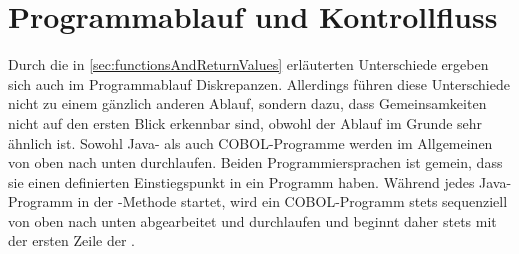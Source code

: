 \section{Programmablauf und Kontrollfluss}\label{programmablauf}
Durch die in \autoref{sec:functionsAndReturnValues} erläuterten Unterschiede ergeben sich auch im Pro\-gramm\-ab\-lauf Diskrepanzen. Allerdings führen diese Unterschiede nicht zu einem gänzlich anderen Ablauf, sondern dazu, dass Gemeinsamkeiten nicht auf den ersten Blick erkennbar sind, obwohl der Ablauf im Grunde sehr ähnlich ist. Sowohl Java- als auch COBOL-Programme werden im Allgemeinen von oben nach unten durchlaufen. Beiden Programmiersprachen ist gemein, dass sie einen definierten Einstiegspunkt in ein Programm haben. Während jedes Java-Programm in der -Methode startet, wird ein COBOL-Programm stets sequenziell von oben nach unten abgearbeitet und durchlaufen und beginnt daher stets mit der ersten Zeile der .






